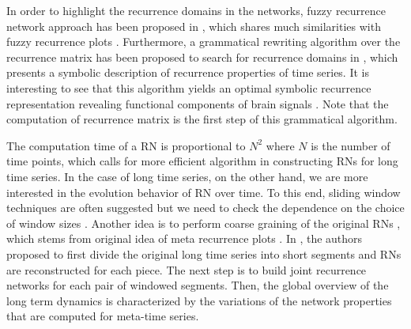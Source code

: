 		In order to highlight the recurrence domains in the networks, fuzzy recurrence network approach has been proposed in \cite{Pham2017}, which shares much similarities with fuzzy recurrence plots \cite{Pham2016}. Furthermore, a grammatical rewriting algorithm over the recurrence matrix has been proposed to search for recurrence domains in \cite{graben2013}, which presents a symbolic description of recurrence properties of time series. It is interesting to see that this algorithm yields an optimal symbolic recurrence representation revealing functional components of brain signals \cite{graben2013}. Note that the computation of recurrence matrix is the first step of this grammatical algorithm. 

		The computation time of a RN is proportional to $N^2$ where $N$ is the number of time points, which calls for more efficient algorithm in constructing RNs for long time series. In the case of long time series, on the other hand, we are more interested in the evolution behavior of RN over time. To this end, sliding window techniques are often suggested but we need to check the dependence on the choice of window sizes \cite{Donges2011a,Donges2011}. Another idea is to perform coarse graining of the original RNs \cite{Costa2018}, which stems from original idea of meta recurrence plots \cite{casdagli97}. In \cite{Iwayama2012}, the authors proposed to first divide the original long time series into short segments and RNs are reconstructed for each piece. The next step is to build joint recurrence networks for each pair of windowed segments. Then, the global overview of the long term dynamics is characterized by the variations of the network properties that are computed for meta-time series. 


